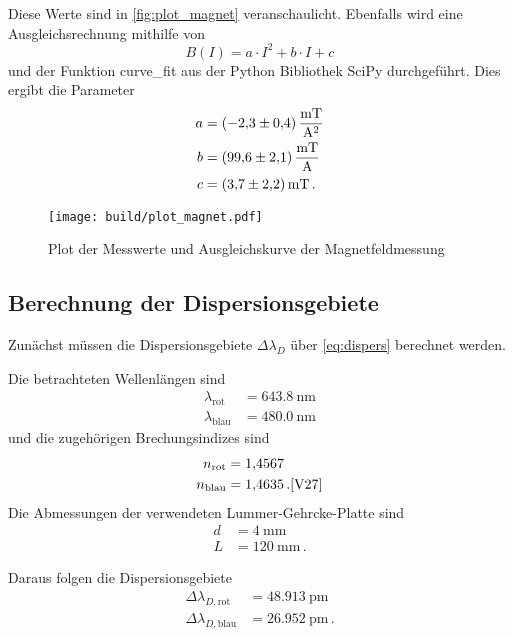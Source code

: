 Diese Werte sind in \autoref{fig:plot_magnet} veranschaulicht. 
Ebenfalls wird eine Ausgleichsrechnung mithilfe von
\begin{equation}
    B(I) = a \cdot I^2 + b \cdot I + c
    \label{eq:ausgleich}
\end{equation}
und der Funktion curve\_fit aus der Python Bibliothek SciPy durchgeführt. \cite{scipy}
Dies ergibt die Parameter
\begin{align*}
    a &= \SI{-2.3+-0.4}{\milli\tesla\per\ampere\squared} \\
    b &= \SI{99.6+-2.1}{\milli\tesla\per\ampere} \\
    c &= \SI{3.7+-2.2}{\milli\tesla} \, .
\end{align*}

\begin{figure}
    \centering
    \texttt{[image: build/plot\_magnet.pdf]}
    \caption{Plot der Messwerte und Ausgleichskurve der Magnetfeldmessung}
    \label{fig:plot_magnet}
\end{figure}

\subsection{Berechnung der Dispersionsgebiete}
\label{ssec:Berechnung der Dispersionsgebiete}

Zunächst müssen die Dispersionsgebiete $\Delta\lambda_D$ über \autoref{eq:dispers} berechnet werden.

Die betrachteten Wellenlängen sind
\begin{align*}
    \lambda_\text{rot} &= \SI{643.8}{\nano\meter} \\
    \lambda_\text{blau} &= \SI{480.0}{\nano\meter}
\end{align*}
und die zugehörigen Brechungsindizes sind
\begin{align*}
    n_\text{rot} &= \num{1.4567} \\
    n_\text{blau} &= \num{1.4635} \, . \text{\cite{V27}}
\end{align*}
Die Abmessungen der verwendeten Lummer-Gehrcke-Platte sind 
\begin{align*}
    d &= \SI{4}{\milli\meter} \\
    L &= \SI{120}{\milli\meter} \, .
\end{align*}

Daraus folgen die Dispersionsgebiete
\begin{align*}
    \Delta\lambda_{D,\text{rot}} &= \SI{48.913}{\pico\meter} \\
    \Delta\lambda_{D,\text{blau}} &= \SI{26.952}{\pico\meter} \, .
\end{align*}

